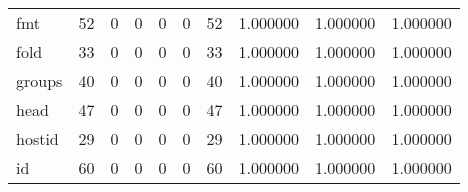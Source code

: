 \begin{longtable}{lrrrrrrrrr}
fmt       &                                        52 &                                                  0 &                                                  0 &                                                  0 &                                                  0 &                                                 52 &                                           1.000000 &                               1.000000 &                             1.000000 \\
fold      &                                        33 &                                                  0 &                                                  0 &                                                  0 &                                                  0 &                                                 33 &                                           1.000000 &                               1.000000 &                             1.000000 \\
groups    &                                        40 &                                                  0 &                                                  0 &                                                  0 &                                                  0 &                                                 40 &                                           1.000000 &                               1.000000 &                             1.000000 \\
head      &                                        47 &                                                  0 &                                                  0 &                                                  0 &                                                  0 &                                                 47 &                                           1.000000 &                               1.000000 &                             1.000000 \\
hostid    &                                        29 &                                                  0 &                                                  0 &                                                  0 &                                                  0 &                                                 29 &                                           1.000000 &                               1.000000 &                             1.000000 \\
id        &                                        60 &                                                  0 &                                                  0 &                                                  0 &                                                  0 &                                                 60 &                                           1.000000 &                               1.000000 &                             1.000000 \\

\end{longtable}
